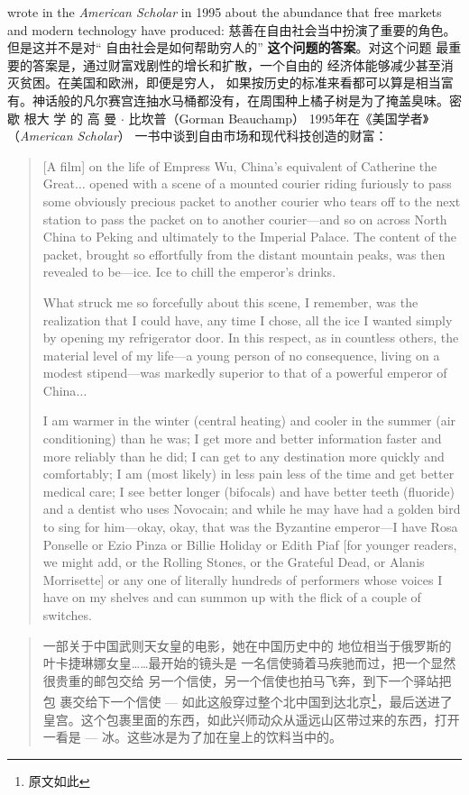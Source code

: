 \begin{paracol}{2}
wrote in the \textit{American Scholar} in 1995 about the abundance that
free markets and modern technology have produced:
\switchcolumn
慈善在自由社会当中扮演了重要的角色。但是这并不是对“ 自由社会是如何帮助穷人的” \textbf{这个问题的答案}。对这个问题
最重要的答案是，通过财富戏剧性的增长和扩散，一个自由的
经济体能够减少甚至消灭贫困。在美国和欧洲，即便是穷人，
如果按历史的标准来看都可以算是相当富有。神话般的凡尔赛宫连抽水马桶都没有，在周围种上橘子树是为了掩盖臭味。密
歇 根大 学 的 高 曼 $\cdot$ 比坎普（Gorman  Beauchamp） 1995年在《美国学者》（\textit{American Scholar}） 一书中谈到自由市场和现代科技创造的财富：
\switchcolumn*
\begin{quotation}
[A film] on the life of Empress Wu, China's equivalent of Catherine the Great$\ldots$ opened with a scene of a mounted courier riding furiously to pass some obviously precious packet to another
courier who tears off to the next station to pass the packet on to
another courier---and so on across North China to Peking and ultimately to the Imperial Palace. The content of the packet,
brought so effortfully from the distant mountain peaks, was then
revealed to be---ice. Ice to chill the emperor's drinks.


What struck me so forcefully about this scene, I remember,
was the realization that I could have, any time I chose, all the ice
I wanted simply by opening my refrigerator door. In this respect,
as in countless others, the material level of my life---a young person of no consequence, living on a modest stipend---was
markedly superior to that of a powerful emperor of China$\ldots$


I am warmer in the winter (central heating) and cooler in the
summer (air conditioning) than he was; I get more and better information faster and more reliably than he did; I can get to any
destination more quickly and comfortably; I am (most likely) in
less pain less of the time and get better medical care; I see better
longer (bifocals) and have better teeth (fluoride) and a dentist
who uses Novocain; and while he may have had a golden bird to
sing for him---okay, okay, that was the Byzantine emperor---I
have Rosa Ponselle or Ezio Pinza or Billie Holiday or Edith Piaf
[for younger readers, we might add, or the Rolling Stones, or the
Grateful Dead, or Alanis Morrisette] or any one of literally hundreds of performers whose voices I have on my shelves and can
summon up with the flick of a couple of switches.
\end{quotation}
\switchcolumn
\begin{quotation}
一部关于中国武则天女皇的电影，她在中国历史中的
地位相当于俄罗斯的叶卡捷琳娜女皇……最开始的镜头是
一名信使骑着马疾驰而过，把一个显然很贵重的邮包交给
另一个信使，另一个信使也拍马飞奔，到下一个驿站把包
裹交给下一个信使 --- 如此这般穿过整个北中国到达北京\footnote{原文如此}，最后送进了皇宫。这个包裹里面的东西，如此兴师动众从遥远山区带过来的东西，打开一看是 --- 冰。这些冰是为了加在皇上的饮料当中的。
	

\end{quotation}
\end{paracol}
